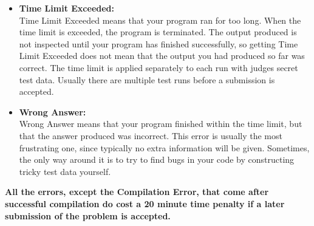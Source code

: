 \documentclass[11pt,letterpaper,oneside]{article}
\begin{document}
\begin{itemize}
    \item \textbf{Time Limit Exceeded:}\\
    Time Limit Exceeded means that your program ran for too long. When the time limit is exceeded, the program is terminated. The output produced is not inspected until your program has finished successfully, so getting Time Limit Exceeded does not mean that the output you had produced so far was correct.  The time limit is applied separately to each run with judges secret test data.  Usually there are multiple test runs before a submission is accepted.
    \item \textbf{Wrong Answer:}\\
    Wrong Answer means that your program finished within the time limit, but that the answer produced was incorrect. This error is usually the most frustrating one, since typically no extra information will be given. Sometimes, the only way around it is to try to find bugs in your code by constructing tricky test data yourself.
\end{itemize}

\textbf{All the errors, except the Compilation Error, that come after successful compilation do cost a 20 minute time penalty if a later submission of the problem is accepted.}
\end{document}
